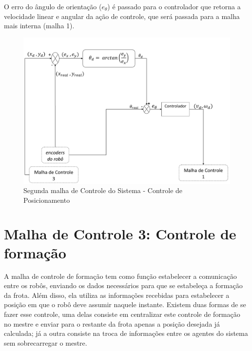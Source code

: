 O erro do ângulo de orientação (\emph{$e_{\theta}$}) é passado para o controlador que retorna a velocidade linear e angular da ação de controle, que será passada para a malha mais interna (malha 1). %

\begin{figure}[!htb]
	\centering
	\includegraphics[width=1.0\textwidth]{./04-figuras/malha2}
	\caption{Segunda malha de Controle do Sistema - Controle de Posicionamento}
	\label{fig:malha2}
\end{figure}

\section{Malha de Controle 3: Controle de formação}
\label{sec:malha3 }
A malha de controle de formação tem como função estabelecer a comunicação entre os robôs, enviando os dados necessários para que se estabeleça a formação da frota. Além disso, ela utiliza as informações recebidas para estabelecer a posição em que o robô deve assumir naquele instante. Existem duas formas de se fazer esse controle, uma delas consiste em centralizar este controle de formação no mestre e enviar para o restante da frota apenas a posição desejada já calculada; já a outra consiste na troca de informações entre os agentes do sistema sem sobrecarregar o mestre.

